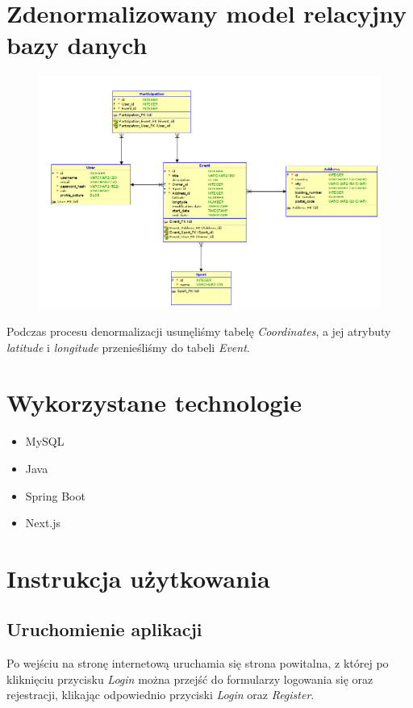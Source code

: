 \documentclass[11pt,a4paper]{article}
\begin{document}
\section{Zdenormalizowany model relacyjny bazy danych}

\begin{figure} [H]
    \centering
    \includegraphics[width=0.95\linewidth]{model/model_denorm.png}
\end{figure}

Podczas procesu denormalizacji usunęliśmy tabelę \textit{Coordinates}, a jej atrybuty \textit{latitude} i \textit{longitude} przenieśliśmy do tabeli \textit{Event}.

\section{Wykorzystane technologie}

\begin{itemize}
    \item MySQL
    \item Java
    \item Spring Boot
    \item Next.js
\end{itemize}

\section{Instrukcja użytkowania}

\subsection{Uruchomienie aplikacji}

Po wejściu na stronę internetową uruchamia się strona powitalna, z której po kliknięciu przycisku \textit{Login} można przejść do formularzy logowania się oraz rejestracji, klikając odpowiednio przyciski \textit{Login} oraz \textit{Register}. 
\end{document}

